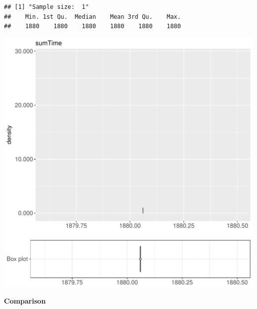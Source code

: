 \documentclass{article}\usepackage[]{graphicx}\usepackage[]{color}
\makeatletter
\def\maxwidth{ %
  \ifdim\Gin@nat@width>\linewidth
    \linewidth
  \else
    \Gin@nat@width
  \fi
}
\newenvironment{kframe}{%
 \def\at@end@of@kframe{}%
 \ifinner\ifhmode%
  \def\at@end@of@kframe{\end{minipage}}%
  \begin{minipage}{\columnwidth}%
 \fi\fi%
 \def\FrameCommand##1{\hskip\@totalleftmargin \hskip-\fboxsep
 \colorbox{shadecolor}{##1}\hskip-\fboxsep
     \hskip-\linewidth \hskip-\@totalleftmargin \hskip\columnwidth}%
 \MakeFramed {\advance\hsize-\width
   \@totalleftmargin\z@ \linewidth\hsize
   \@setminipage}}%
 {\par\unskip\endMakeFramed%
 \at@end@of@kframe}
\newenvironment{knitrout}{}{} %
\makeatother
\begin{document}
\begin{knitrout}
\color{fgcolor}\begin{kframe}
\begin{verbatim}
## [1] "Sample size:  1"
##    Min. 1st Qu.  Median    Mean 3rd Qu.    Max. 
##    1880    1880    1880    1880    1880    1880
\end{verbatim}


{\ttfamily\noindent\bfseries{}}\end{kframe}
\includegraphics[width=\maxwidth]{figure/RH3_noCache_small-1} 

\end{knitrout}
  
 \textbf{Comparison}
  
\end{document}
